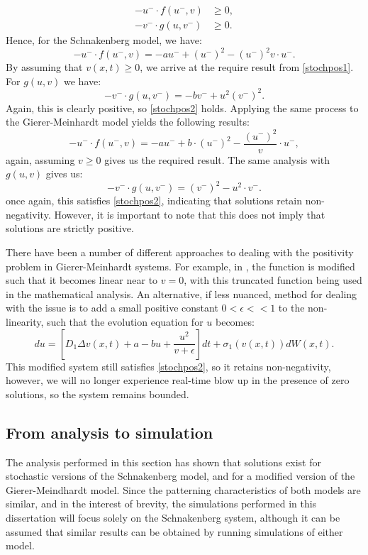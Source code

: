 \documentclass[12pt]{article}
\begin{document}
\begin{align}
\label{stochpos1} 
-u^- \cdot f(u^-,v) &\geq 0,\\
\label{stochpos2}
-v^- \cdot g(u,v^-) &\geq 0.
\end{align}
Hence, for the Schnakenberg model, we have:
$$-u^- \cdot f(u^-,v) = -au^- + (u^-)^2 - (u^-)^2v \cdot u^-.$$
By assuming that $v(x,t) \geq 0$, we arrive at the require result from \eqref{stochpos1}. For $g(u,v)$ we have:
$$-v^- \cdot g(u,v^-) = -bv^- + u^2(v^-)^2.$$
Again, this is clearly positive, so \eqref{stochpos2} holds. Applying the same process to the Gierer-Meinhardt model yields the following results:
$$-u^- \cdot f(u^-,v) = -au^- + b\cdot (u^-)^2 - \frac{(u^-)^2}{v}\cdot u^-,$$
again, assuming $v \geq 0$ gives us the required result. The same analysis with $g(u,v)$ gives us:
$$-v^- \cdot g(u,v^-) = (v^-)^2 - u^2\cdot v^-.$$
once again, this satisfies \eqref{stochpos2}, indicating that solutions retain non-negativity. However, it is important to note that this does not imply that solutions are strictly positive. 

There have been a number of different approaches to dealing with the positivity problem in Gierer-Meinhardt systems. For example, in \cite{Kelkel2}, the function is modified such that it becomes linear near to $v=0$, with this truncated function being used in the mathematical analysis. An alternative, if less nuanced, method for dealing with the issue is to add a small positive constant $0< \epsilon << 1$ to the non-linearity, such that the evolution equation for $u$ becomes:
\begin{equation}
    du = \left[D_1 \Delta v(x,t) + a - bu + \frac{u^2}{v+\epsilon}\right]dt + \sigma_1(v(x,t))dW(x,t).
\end{equation}
This modified system still satisfies \eqref{stochpos2}, so it retains non-negativity, however, we will no longer experience real-time blow up in the presence of zero solutions, so the system remains bounded.

\subsection{From analysis to simulation}
The analysis performed in this section has shown that solutions exist for stochastic versions of the Schnakenberg model, and for a modified version of the Gierer-Meindhardt model. Since the patterning characteristics of both models are similar, and in the interest of brevity, the simulations performed in this dissertation will focus solely on the Schnakenberg system, although it can be assumed that similar results can be obtained by running simulations of either model.  
\end{document}
